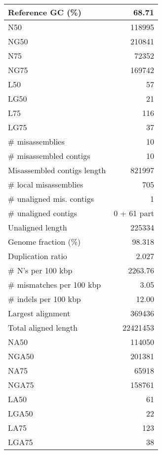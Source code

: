 \documentclass[a4paper]{article}
\begin{document}
\begin{table}[ht]
\begin{center}
\begin{tabular}{|l*{1}{|r}|}
Reference GC (\%) & 68.71 \\ \hline
N50 & 118995  \\ \hline
NG50 & 210841 \\ \hline
N75  & 72352  \\ \hline
NG75 & 169742 \\ \hline
L50 & 57 \\ \hline
LG50 & 21 \\ \hline
L75 & 116 \\ \hline
LG75 & 37 \\ \hline
\# misassemblies & 10 \\ \hline
\# misassembled contigs & 10 \\ \hline
Misassembled contigs length & 821997 \\ \hline
\# local misassemblies & 705 \\ \hline
\# unaligned mis. contigs & 1 \\ \hline
\# unaligned contigs & 0 + 61 part \\ \hline
Unaligned length & 225334 \\ \hline
Genome fraction (\%) & 98.318 \\ \hline
Duplication ratio & 2.027  \\ \hline
\# N's per 100 kbp & 2263.76  \\ \hline
\# mismatches per 100 kbp & 3.05 \\ \hline
\# indels per 100 kbp & 12.00 \\ \hline
Largest alignment & 369436 \\ \hline
Total aligned length & 22421453 \\ \hline
NA50 & 114050  \\ \hline
NGA50 & 201381 \\ \hline
NA75 & 65918 \\ \hline
NGA75 & 158761 \\ \hline
LA50 & 61 \\ \hline
LGA50 & 22 \\ \hline
LA75 & 123 \\ \hline
LGA75 & 38 \\ \hline
\end{tabular}
\end{center}
\end{table}
\end{document}
